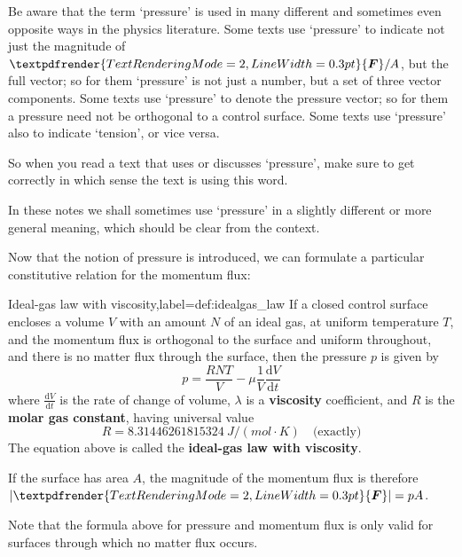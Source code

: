 \documentclass[a4paper,12pt,%
onecolumn,oneside,titlepage,%
british%
]{memoir}
\providecommand{\href}[2]{#2}
\renewcommand*{\bm}[1]{\textpdfrender{TextRenderingMode=2,LineWidth=0.3pt}{\boldsymbol{#1}}}
\newcommand*{\di}{\mathrm{d}}%
\DeclarePairedDelimiter\abs{\lvert}{\rvert}
\renewcommand*{\|}[1][]{\nonscript\:#1\vert\nonscript\:\mathopen{}}
\newcommand*{\furl}[2]{\href{#1}{#2}\pagenote{\url{#1}}}
\newcommand*{\ypr}{p}
\newcommand*{\yN}{N}
\newcommand*{\yF}{\bm{F}}
\newcommand*{\yvis}{\mu}%
\newcommand*{\yte}{T}%
\begin{document}
\begin{warning}
  Be aware that the term \enquote*{pressure} is used in many different and sometimes even opposite ways in the physics literature. Some texts use \enquote*{pressure} to indicate not just the magnitude of $\yF/A$, but the full vector; so for them \enquote*{pressure} is not just a number, but a set of three vector components. Some texts use \enquote*{pressure} to denote the pressure vector; so for them a pressure need not be orthogonal to a control surface. Some texts use \enquote*{pressure} also to indicate \enquote*{tension}, or vice versa.

  So when you read a text that uses or discusses \enquote*{pressure}, make sure to get correctly in which sense the text is using this word.

  In these notes we shall sometimes use \enquote*{pressure} in a slightly different or more general meaning, which should be clear from the context.
\end{warning}


Now that the notion of pressure is introduced, we can formulate a particular constitutive relation for the momentum flux:

\begin{definition}{Ideal-gas law with viscosity,label={def:idealgas_law}}
  If a closed control surface encloses a volume $V$ with an amount $\yN$ of an ideal gas, at uniform temperature $\yte$, and the momentum flux is orthogonal to the surface and uniform throughout, and there is no matter flux through the surface, then the pressure $p$ is given by
  \begin{equation}
    \label{eq:ideal_gas_p}
    \ypr = \frac{R \yN \yte}{V}  - \yvis \frac{1}{V}\frac{\di V}{\di t}
  \end{equation}
  where $\frac{\di V}{\di t}$ is the rate of change of volume, $\lambda$ is a \textbf{viscosity} coefficient, and $R$ is the \furl{https://doi.org/10.1351/goldbook.G02579}{\textbf{molar gas constant}}, having universal value
  \begin{equation*}
    R = \qty{8.31446261815324}{J/(mol\cdot K)}\quad\text{(exactly)}
  \end{equation*}
The equation above is called the \textbf{ideal-gas law with viscosity}.

  \smallskip

  If the surface has area $A$, the magnitude of the momentum flux is therefore $\abs{\yF} = \ypr A$.

\end{definition}
Note that the formula above for pressure and momentum flux is only valid for surfaces through which no matter flux occurs.
\end{document}
